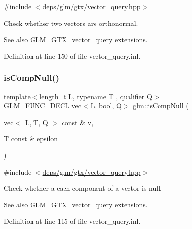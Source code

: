 {\ttfamily \#include $<$\hyperlink{vector__query_8hpp}{deps/glm/gtx/vector\+\_\+query.\+hpp}$>$}

Check whether two vectors are orthonormal. \begin{DoxySeeAlso}{See also}
\hyperlink{group__gtx__vector__query}{G\+L\+M\+\_\+\+G\+T\+X\+\_\+vector\+\_\+query} extensions. 
\end{DoxySeeAlso}


Definition at line 150 of file vector\+\_\+query.\+inl.

\mbox{\label{group__gtx__vector__query_gaf6ec1688eab7442fe96fe4941d5d4e76}} 
\subsubsection{\texorpdfstring{is\+Comp\+Null()}{isCompNull()}}
{\footnotesize\ttfamily template$<$length\+\_\+t L, typename T , qualifier Q$>$ \\
G\+L\+M\+\_\+\+F\+U\+N\+C\+\_\+\+D\+E\+CL \hyperlink{structglm_1_1vec}{vec}$<$L, bool, Q$>$ glm\+::is\+Comp\+Null (\begin{DoxyParamCaption}\item[{\hyperlink{structglm_1_1vec}{vec}$<$ L, T, Q $>$ const \&}]{v,  }\item[{T const \&}]{epsilon }\end{DoxyParamCaption})}



{\ttfamily \#include $<$\hyperlink{vector__query_8hpp}{deps/glm/gtx/vector\+\_\+query.\+hpp}$>$}

Check whether a each component of a vector is null. \begin{DoxySeeAlso}{See also}
\hyperlink{group__gtx__vector__query}{G\+L\+M\+\_\+\+G\+T\+X\+\_\+vector\+\_\+query} extensions. 
\end{DoxySeeAlso}


Definition at line 115 of file vector\+\_\+query.\+inl.

\mbox{\label{group__gtx__vector__query_gac3c974f459fd75453134fad7ae89a39e}} 
